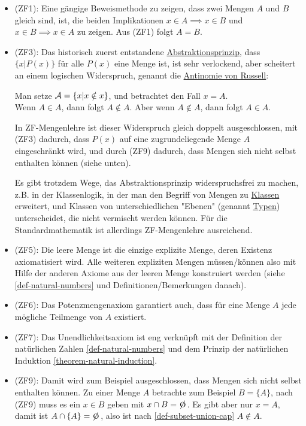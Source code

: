 \begin{remark}
    \begin{itemize}
        \item (ZF1): Eine gängige Beweismethode zu zeigen, dass zwei Mengen $A$ und $B$ gleich sind, ist, die beiden Implikationen $x \in A \implies x \in B$ und $x \in B \implies x \in A$ zu zeigen. Aus (ZF1) folgt $A = B$.
        \item (ZF3): Das historisch zuerst entstandene \underline{Abstraktionsprinzip}, dass $\{x | P(x)\}$ für alle $P(x)$ eine Menge ist, ist sehr verlockend\footnotemark, aber scheitert an einem logischen Widerspruch, genannt die \underline{Antinomie von Russell}:

        Man setze $\mathcal{A} = \{x | x \notin x\}$, und betrachtet den Fall $x = A$.\\
        Wenn $A \in A$, dann folgt $A \notin A$. Aber wenn $A \notin A$, dann folgt $A \in A$. \absurdum

        In ZF-Mengenlehre ist dieser Widerspruch gleich doppelt ausgeschlossen, mit (ZF3) dadurch, dass $P(x)$ auf eine zugrundeliegende Menge $A$ eingeschränkt wird, und durch (ZF9) dadurch, dass Mengen sich nicht selbst enthalten können (siehe unten).

        Es gibt trotzdem Wege, das Abstraktionsprinzip widerspruchsfrei zu machen, z.B. in der Klassenlogik, in der man den Begriff von Mengen zu \underline{Klassen} erweitert, und Klassen von unterschiedlichen "Ebenen" (genannt \underline{Typen}) unterscheidet, die nicht vermischt werden können. Für die Standardmathematik ist allerdings ZF-Mengenlehre ausreichend.
        \item (ZF5): Die leere Menge ist die einzige explizite Menge, deren Existenz axiomatisiert wird. Alle weiteren expliziten Mengen müssen/können also mit Hilfe der anderen Axiome aus der leeren Menge konstruiert werden (siehe \ref{def-natural-numbers} und Definitionen/Bemerkungen danach).
        \item (ZF6): Das Potenzmengenaxiom garantiert auch, dass für eine Menge $A$ jede mögliche Teilmenge von $A$ existiert.
        \item (ZF7): Das Unendlichkeitsaxiom ist eng verknüpft mit der Definition der natürlichen Zahlen \ref{def-natural-numbers} und dem Prinzip der natürlichen Induktion \ref{theorem-natural-induction}.
        \item (ZF9): Damit wird zum Beispiel ausgeschlossen, dass Mengen sich nicht selbst enthalten können. Zu einer Menge $A$ betrachte zum Beispiel $B = \{A\}$, nach (ZF9) muss es ein $x \in B$ geben mit $x \cap B = \e$. Es gibt aber nur $x = A$, damit ist $A \cap \{A\} = \e$, also ist nach \ref{def-subset-union-cap} $A \notin A$.
    \end{itemize}
\end{remark}

